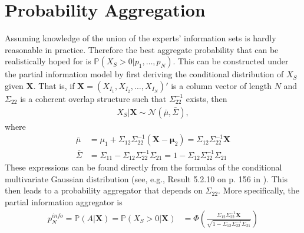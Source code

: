\documentclass[11pt]{article}
\renewcommand{\P}{\mathbb{P}}
\theoremstyle{definition}
\theoremstyle{definition}
\begin{document}
%
%




\section{Probability Aggregation}
Assuming knowledge of the union of the experts' information sets is hardly reasonable in practice. Therefore the best aggregate probability that can be realistically hoped for is  $\P(X_{S} > 0 | p_1, \dots, p_N)$.  This can be constructed under the partial information model by first deriving the conditional distribution of $X_S$ given $\boldsymbol{X}$. That is, if $\boldsymbol{X} = (X_{I_1}, X_{I_2},  \dots, X_{I_N})'$ is a column vector of length $N$ and $\Sigma_{22}$ is a coherent overlap structure such that $\Sigma_{22}^{-1}$ exists, then 
\begin{align*}
X_{S} | \boldsymbol{X} \sim \mathcal{N}(\bar{\mu}, \bar{\Sigma}), 
\end{align*}
where
\begin{align}
\bar{\mu} &= \mu_1 + \Sigma_{12} \Sigma_{22}^{-1} (\boldsymbol{X} - \boldsymbol{\mu}_2) =  \Sigma_{12} \Sigma_{22}^{-1} \boldsymbol{X} \label{condMu}\\
 \bar{\Sigma}&= \Sigma_{11} - \Sigma_{12} \Sigma_{22}^{-1} \Sigma_{21} =1 - \Sigma_{12} \Sigma_{22}^{-1} \Sigma_{21}  \label{condSigma}
\end{align}
These expressions can be found directly from the formulas of the conditional multivariate Gaussian distribution (see, e.g., Result 5.2.10 on p. 156 in \cite{ravishanker2001first}). This then leads to a probability aggregator that depends on $\Sigma_{22}$. More specifically, the partial information aggregator is
\begin{align}
p_N^{info} = \P\left(A  | \boldsymbol{X}\right)  = \P\left(X_{S} > 0 | \boldsymbol{X}\right) &= \Phi\left( \frac{\Sigma_{12} \Sigma_{22}^{-1} \boldsymbol{X}}{\sqrt{1 - \Sigma_{12} \Sigma_{22}^{-1} \Sigma_{21}}}\right) \label{GeneralAggregator}
\end{align}
\end{document}
